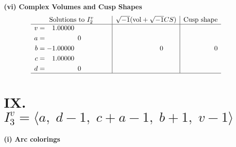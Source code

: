 \documentclass[1p]{elsarticle_modified}
\theoremstyle{definition}
\newcommand{\I}{\sqrt{-1}}
\begin{document}
\newpage\flushleft \textbf{(vi) Complex Volumes and Cusp Shapes}
$$\begin{array}{c|c|c}  
\text{Solutions to }I^v_{2}& \I (\text{vol} + \sqrt{-1}CS) & \text{Cusp shape}\\
 \hline 
\begin{aligned}
v &= \phantom{-}1.00000\phantom{ +0.000000I} \\
a &= \phantom{-0.000000 } 0 \\
b &= -1.00000\phantom{ +0.000000I} \\
c &= \phantom{-}1.00000\phantom{ +0.000000I} \\
d &= \phantom{-0.000000 } 0\end{aligned}
 & \phantom{-0.000000 } 0 & \phantom{-0.000000 } 0\\
 \hline 
 \end{array}$$\newpage\newpage\renewcommand{\arraystretch}{1}
\centering \section*{IX. $I^v_{3}= \langle a,\;d-1,\;c+a-1,\;b+1,\;v-1 \rangle$}
\flushleft \textbf{(i) Arc colorings}\\
\end{document}
